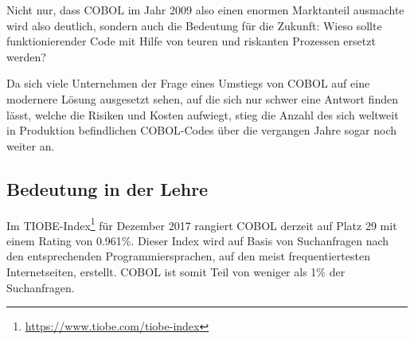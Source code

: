 Nicht nur, dass COBOL im Jahr 2009 also einen enormen Marktanteil ausmachte wird also deutlich, sondern auch die Bedeutung für die Zukunft: Wieso sollte funktionierender Code mit Hilfe von teuren und riskanten Prozessen ersetzt werden?

Da sich viele Unternehmen der Frage eines Umstiegs von COBOL auf eine modernere Lösung ausgesetzt sehen, auf die sich nur schwer eine Antwort finden lässt, welche die Risiken und Kosten aufwiegt, stieg die Anzahl  des sich weltweit in Produktion befindlichen COBOL-Codes über die vergangen Jahre sogar noch weiter an.

\subsection{Bedeutung in der Lehre}



Im TIOBE-Index\footnote{\url{https://www.tiobe.com/tiobe-index}} für Dezember 2017 rangiert COBOL derzeit auf Platz 29 mit einem Rating von 0.961\%. Dieser Index wird auf Basis von Suchanfragen nach den entsprechenden Programmiersprachen, auf den meist frequentiertesten Internetseiten, erstellt. COBOL ist somit Teil von weniger als 1\% der Suchanfragen.

